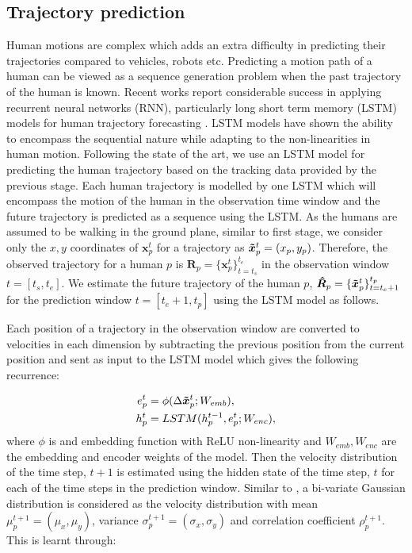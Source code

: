 \documentclass[conference]{IEEEtran}
\begin{document}
\subsection{Trajectory prediction}
Human motions are complex which adds an extra difficulty in predicting their trajectories compared to vehicles, robots etc. Predicting a motion path of a human can be viewed as a sequence generation  problem when the past trajectory of the human is known. Recent works report considerable success in applying recurrent neural networks (RNN), particularly long short term memory (LSTM) models for human trajectory forecasting \cite{sociallstm,trajnet}. LSTM models have shown the ability to encompass the sequential nature while adapting to the non-linearities in human motion. Following the state of the art, we use an LSTM model for predicting the human trajectory based on the tracking data provided by the previous stage. Each human trajectory is modelled by one LSTM which will encompass the motion of the human in the observation time window and the future trajectory is predicted as a sequence using the LSTM. As the humans are assumed to be walking in the ground plane, similar to first stage, we consider only the $x,y$ coordinates of $\bm{x}^t_p$ for a trajectory as $\bm{\Tilde{x}}^t_p = ( x_p , y_p )$. Therefore, the observed trajectory for a human $p$ is $\bm{R}_p = \{\bm{x}^t_p\}^{t_{e}}_{t = t_{s}} $ in the observation window $t= [{t_{s}}, t_{e}]$. We  estimate the future trajectory of the human $p$, $\bm{\Hat{R}}_p = \{\bm{\Tilde{x}}^t_p\}^{t_{p}}_{t = t_{e} + 1}$ for the prediction window  $t= [{t_{e} + 1}, t_{p}]$ using the LSTM model as follows. 

Each position of a trajectory in the observation window are converted to velocities in each dimension by subtracting the previous position from the current position and sent as input to the LSTM model which gives the following recurrence:

\begin{subequations}
\begin{align}
e^t_p &= \phi ( \Delta \bm{\Tilde{x}}^t_p; W_{emb}), \\
h^t_p &= LSTM ( h^{t-1}_p, e^t_p ; W_{enc}),
\end{align}
\end{subequations}where $\phi$ is and embedding function with ReLU non-linearity and $W_{emb}, W_{enc} $ are the embedding and encoder weights of the model. Then the velocity distribution of the time step, $t+1$ is estimated using the hidden state of the time step, $t$ for each of the time steps in the prediction window. Similar to \cite{sociallstm},\cite{trajnet} a bi-variate Gaussian distribution is considered as the velocity distribution with mean $\mu_p^{t+1} = ( \mu_x , \mu_y )$, variance $\sigma_p^{t+1} = (\sigma_x , \sigma_y)$ and correlation coefficient $\rho_p^{t+1}$. This is learnt through:
\end{document}
